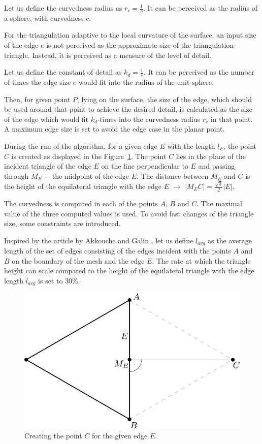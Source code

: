 Let us define the curvedness radius as $r_c = \frac{1}{c}$. It can be perceived as
the radius of a sphere, with curvedness $c$.

For the triangulation adaptive to the local curvature of the surface, an input
size of the edge $e$ is not perceived as the approximate size of the triangulation
triangle. Instead, it is perceived as a measure of the level of detail.

Let us define the constant of detail as $k_d = \frac{1}{e}$. It can be perceived
as the number of times the edge size $e$ would fit into the radius of the unit
sphere.

Then, for given point $P$, lying on the surface, the size of the edge, which
should be used around that point to achieve the desired detail, is 
calculated as the size of the edge which would fit $k_d$-times into 
the curvedness radius $r_c$ in that point.
A maximum edge size is set to avoid the edge case in the planar point.

During the run of the algorithm, for a given edge $E$ with the length $l_E$, the point
$C$ is created as displayed in the Figure~\ref{img:57}. The point $C$ lies
in the plane of the incident triangle of the edge $E$ on the line perpendicular
to $E$ and passing through $M_E$ $-$ the midpoint of the edge $E$. The distance between
$M_E$ and $C$ is the height of the equilateral triangle with the edge $E$ $\longrightarrow$
$|M_E C|=\frac{\sqrt{3}}{2}|E|$.

The curvedness is computed in each of the points $A$, $B$ and $C$.
The maximal value of the three computed values is used.
To avoid fast changes of the triangle size, some constraints are 
introduced. 

Inspired by the article by Akkouche and Galin \cite{akkouche2001adaptive},
let us define $l_{avg}$ as the average length of the set of edges consisting
of the edges incident with the points $A$ and $B$ on the boundary of the mesh
and the edge $E$.
The rate at which the triangle height can scale compared to
the height of the equilateral triangle with the edge length $l_{avg}$ is set to 30\%. 

\begin{figure}
    \centerline{\includegraphics[scale=0.5]{images/img57}}
    \caption[Creating the point $C$]
    {Creating the point $C$ for the given edge $E$.}
    \label{img:57}
\end{figure}

